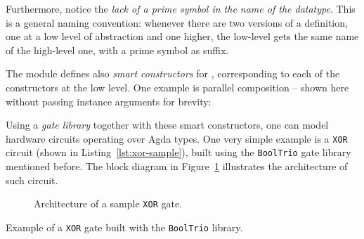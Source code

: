             Furthermore, notice the \emph{lack of a prime symbol in the name of the datatype}.
            This is a general naming convention:
            whenever there are two versions of a definition, one at a low level of abstraction and one higher,
            the low-level gets the same name of the high-level one, with a prime symbol as suffix.

            The  module defines also \emph{smart constructors} for ,
            corresponding to each of the constructors at the low level.
            One example is parallel composition – shown here without passing instance arguments for brevity:

            \begin{center}
            \end{center}

            Using a \emph{gate library} together with these smart constructors, one can model
            hardware circuits operating over Agda types.
            One very simple example is a \texttt{XOR} circuit (shown in Listing~\ref{lst:xor-sample}),
            built using the \texttt{BoolTrio} gate library mentioned before.
            The block diagram in Figure~\ref{fig:xor-sample} illustrates the architecture of such circuit.

            \begin{figure}[h]
                \caption{Architecture of a sample \texttt{XOR} gate.\label{fig:xor-sample}}
            \end{figure}

            \begin{listing}[h]
                \newline
                \caption{Example of a \texttt{XOR} gate built with the \texttt{BoolTrio} library.\label{lst:xor-sample}}
            \end{listing}

